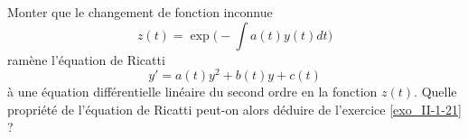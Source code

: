

\begin{exercice}\label{exo_II-1-22}

Monter que le changement de fonction inconnue
\begin{equation}
	z(t)=\exp\big( -\int a(t)y(t)dt \big)
\end{equation}
ramène l'équation de Ricatti
\begin{equation}
	y'=a(t)y^2+b(t)y+c(t)
\end{equation}
à une équation différentielle linéaire du second ordre en la fonction $z(t)$. Quelle propriété de l'équation de Ricatti peut-on alors déduire de l'exercice \ref{exo_II-1-21} ?

\end{exercice}
